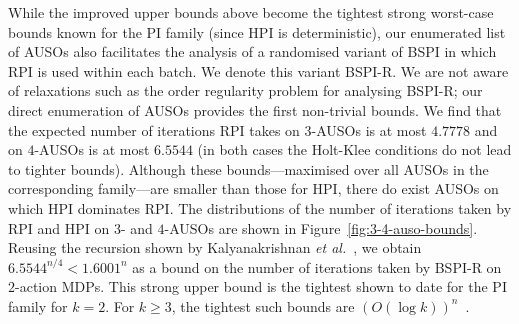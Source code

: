 % 

While the improved upper bounds above become the tightest strong worst-case bounds known for the PI family (since HPI is deterministic), our enumerated list of AUSOs also facilitates the analysis of a randomised variant of BSPI in which RPI is used within each batch. We denote this variant BSPI-R. We are not aware of relaxations such as the order regularity problem for analysing BSPI-R; our direct enumeration of AUSOs provides the first non-trivial bounds. We find that the expected number of iterations RPI takes on $3$-AUSOs is at most $4.7778$ and on $4$-AUSOs is at most $6.5544$ (in both cases the Holt-Klee conditions do not lead to tighter bounds). Although these bounds---maximised over all AUSOs in the corresponding family---are smaller than those for HPI, there do exist AUSOs on which HPI dominates RPI. The distributions of the number of iterations taken by RPI and HPI on $3$- and $4$-AUSOs are shown in Figure~\ref{fig:3-4-auso-bounds}. Reusing the recursion shown by Kalyanakrishnan \textit{et al.}~, we obtain $6.5544^{n/4} < 1.6001^{n}$ as a bound on the number of iterations taken by BSPI-R on $2$-action MDPs. This strong upper bound is the tightest shown to date for the PI family for $k = 2$. 
For $k \geq 3$, %
the tightest such bounds are
$(O(\log k))^{n}$~\cite{Kalyanakrishnan+Gupta}.


